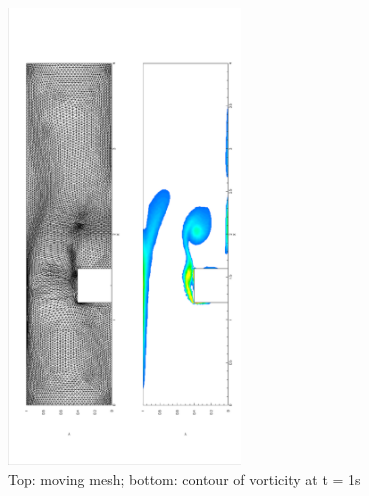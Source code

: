       \begin{figure}[!htbp]
        \centering
        \includegraphics[width = 0.55\textwidth, angle = -90]{picture/first/step_flow_data/mesh_t_1s.eps}
        \caption{\small Top: moving mesh; bottom: contour of vorticity
          at t = 1s}
        \label{fig::step_flow_1s}
      \end{figure}

